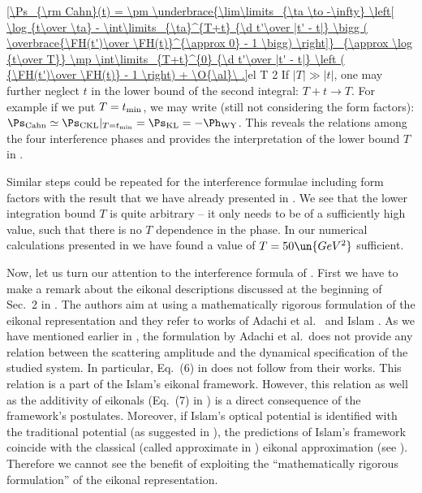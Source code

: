 \eqref{\Ps_{\rm Cahn}(t) =
\pm \underbrace{\lim\limits_{\ta \to -\infty} \left[
	\log {t\over \ta}
	- \int\limits_{\ta}^{T+t} {\d t'\over |t' - t|} \bigg ( \overbrace{\FH(t')\over \FH(t)}^{\approx 0} - 1 \bigg)
\right]}_{\approx \log {t\over T}}
\mp \int\limits_{T+t}^{0} {\d t'\over |t' - t|} \left ( {\FH(t')\over \FH(t)} - 1 \right)
+ \O{\al}\ .}{el T 2}
If $|T| \gg |t|$, one may further neglect $t$ in the lower bound of the second integral: $T+t\rightarrow T$. For example if we put $T=t_{\rm min}$, we may write (still not considering the form factors): $\Ps_{\rm Cahn} \simeq \Ps_{\rm CKL}|_{T=t_{\rm min}} = \Ps_{\rm KL} = - \Ph_{\rm WY}$. This reveals the relations among the four interference phases and provides the interpretation of the lower bound $T$ in .

Similar steps could be repeated for the interference formulae including form factors with the result that we have already presented in . We see that the lower integration bound $T$ is quite arbitrary -- it only needs to be of a sufficiently high value, such that there is no $T$ dependence in the phase. In our numerical calculations presented in  we have found a value of $T=50\un{GeV^2}$ sufficient.


Now, let us turn our attention to the interference formula of \KaL{}. First we have to make a remark about the eikonal descriptions discussed at the beginning of Sec.~2 in . The authors aim at using a mathematically rigorous formulation of the eikonal representation and they refer to works of Adachi et al.~ and Islam . As we have mentioned earlier in , the formulation by Adachi et al.~does not provide any relation between the scattering amplitude and the dynamical specification of the studied system. In particular, Eq.~(6) in  does not follow from their works. This relation is a part of the Islam's eikonal framework. However, this relation as well as the additivity of eikonals (Eq.~(7) in ) is a direct consequence of the framework's postulates. Moreover, if Islam's optical potential is identified with the traditional potential (as suggested in ), the predictions of Islam's framework coincide with the classical (called approximate in ) eikonal approximation (see ). Therefore we cannot see the benefit of exploiting the ``mathematically rigorous formulation'' of the eikonal representation.

